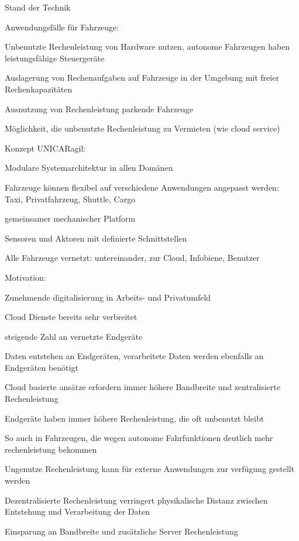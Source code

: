 \begin{notes}
\item Stand der Technik
    \begin{notes}

        \item Anwendungsfälle für Fahrzeuge:
            \begin{notes}
                \item Unbenutzte Rechenleistung von Hardware nutzen, autonome Fahrzeugen haben leistungsfähige Steuergeräte
                \item Auslagerung von Rechenaufgaben auf Fahrzeuge in der Umgebung mit freier Rechenkapazitäten
                \item Ausnutzung von Rechenleistung parkende Fahrzeuge
                \item Möglichkeit, die unbenutzte Rechenleistung zu Vermieten (wie cloud service)
            \end{notes}

    \end{notes}
    \item Konzept UNICARagil:
        \begin{notes}
            \item Modulare Systemarchitektur in allen Domänen 
            \item Fahrzeuge können flexibel auf verschiedene Anwendungen angepasst werden: Taxi, Privatfahrzeug, Shuttle, Cargo
            \item gemeinsamer mechanischer Platform
            \item Sensoren und Aktoren mit definierte Schnittstellen
            \item Alle Fahrzeuge vernetzt: untereinander, zur Cloud, Infobiene, Benutzer 
        \end{notes}
    \item Motivation:
    \begin{notes}
        \item Zunehmende digitalisierung in Arbeits- und Privatumfeld
        \item Cloud Dienste bereits sehr verbreitet
        \item steigende Zahl an vernetzte Endgeräte
        \item Daten entstehen an Endgeräten, verarbeitete Daten werden ebenfalls an Endgeräten benötigt
        \item Cloud basierte ansätze erfordern immer höhere Bandbreite und zentralisierte Rechenleistung
        \item Endgeräte haben immer höhere Rechenleistung, die oft unbenutzt bleibt
        \item So auch in Fahrzeugen, die wegen autonome Fahrfunktionen deutlich mehr rechenleistung bekommen
        \item Ungenutze Rechenleistung kann für externe Anwendungen zur verfügung gestellt werden
        \item Dezentralisierte Rechenleistung verringert physikalische Distanz zwischen Entstehung und Verarbeitung der Daten
        \item Einsparung an Bandbreite und zusätzliche Server Rechenleistung
    \end{notes}


\end{notes}
